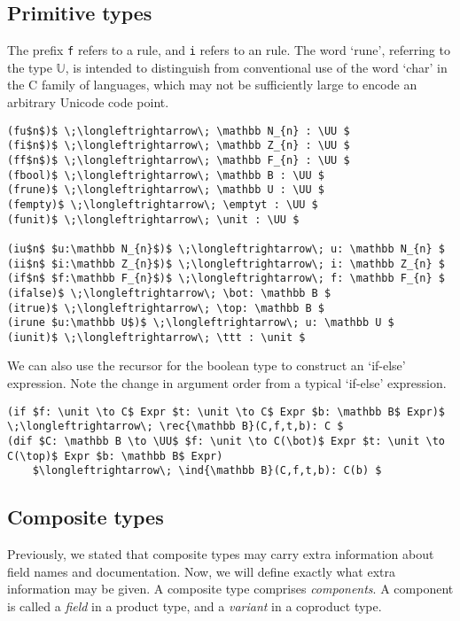 \documentclass[11pt]{book}
\begin{document}
\subsection{Primitive types}
The prefix \lstinline{f} refers to a \rform{} rule, and \lstinline{i} refers to an \rintro{} rule.
The word `rune', referring to the type \( \mathbb U \), is intended to distinguish from conventional use of the word `char' in the C family of languages, which may not be sufficiently large to encode an arbitrary Unicode code point.
\begin{lstlisting}[mathescape=true]
(fu$n$)$ \;\longleftrightarrow\; \mathbb N_{n} : \UU $
(fi$n$)$ \;\longleftrightarrow\; \mathbb Z_{n} : \UU $
(ff$n$)$ \;\longleftrightarrow\; \mathbb F_{n} : \UU $
(fbool)$ \;\longleftrightarrow\; \mathbb B : \UU $
(frune)$ \;\longleftrightarrow\; \mathbb U : \UU $
(fempty)$ \;\longleftrightarrow\; \emptyt : \UU $
(funit)$ \;\longleftrightarrow\; \unit : \UU $

(iu$n$ $u:\mathbb N_{n}$)$ \;\longleftrightarrow\; u: \mathbb N_{n} $
(ii$n$ $i:\mathbb Z_{n}$)$ \;\longleftrightarrow\; i: \mathbb Z_{n} $
(if$n$ $f:\mathbb F_{n}$)$ \;\longleftrightarrow\; f: \mathbb F_{n} $
(ifalse)$ \;\longleftrightarrow\; \bot: \mathbb B $
(itrue)$ \;\longleftrightarrow\; \top: \mathbb B $
(irune $u:\mathbb U$)$ \;\longleftrightarrow\; u: \mathbb U $
(iunit)$ \;\longleftrightarrow\; \ttt : \unit $
\end{lstlisting}
We can also use the recursor for the boolean type to construct an `if-else' expression.
Note the change in argument order from a typical `if-else' expression.
\begin{lstlisting}[mathescape=true]
(if $f: \unit \to C$ Expr $t: \unit \to C$ Expr $b: \mathbb B$ Expr)$ \;\longleftrightarrow\; \rec{\mathbb B}(C,f,t,b): C $
(dif $C: \mathbb B \to \UU$ $f: \unit \to C(\bot)$ Expr $t: \unit \to C(\top)$ Expr $b: \mathbb B$ Expr)
    $\longleftrightarrow\; \ind{\mathbb B}(C,f,t,b): C(b) $
\end{lstlisting}

\subsection{Composite types}
Previously, we stated that composite types may carry extra information about field names and documentation.
Now, we will define exactly what extra information may be given.
A composite type comprises \textit{components}.
A component is called a \textit{field} in a product type, and a \textit{variant} in a coproduct type.
\end{document}
